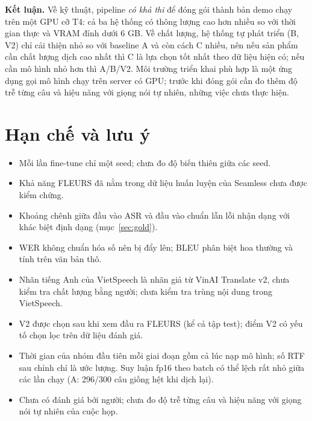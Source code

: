 \documentclass[12pt,a4paper]{article}
\begin{document}
\textbf{Kết luận.} Về kỹ thuật, pipeline \emph{có khả thi} để đóng gói thành bản demo chạy trên một GPU cỡ T4: cả ba hệ thống có thông lượng cao hơn nhiều so với thời gian thực và VRAM đỉnh dưới 6 GB. Về chất lượng, hệ thống tự phát triển (B, V2) chỉ cải thiện nhỏ so với baseline A và còn cách C nhiều, nên nếu sản phẩm cần chất lượng dịch cao nhất thì C là lựa chọn tốt nhất theo dữ liệu hiện có; nếu cần mô hình nhỏ hơn thì A/B/V2. Môi trường triển khai phù hợp là một ứng dụng gọi mô hình chạy trên server có GPU; trước khi đóng gói cần đo thêm độ trễ từng câu và hiệu năng với giọng nói tự nhiên, những việc chưa thực hiện.

\section{Hạn chế và lưu ý}\label{sec:limit}
\begin{itemize}[nosep]
\item Mỗi lần fine-tune chỉ một seed; chưa đo độ biến thiên giữa các seed.
\item Khả năng FLEURS đã nằm trong dữ liệu huấn luyện của Seamless chưa được kiểm chứng.
\item Khoảng chênh giữa đầu vào ASR và đầu vào chuẩn lẫn lỗi nhận dạng với khác biệt định dạng (mục~\ref{sec:gold}).
\item WER không chuẩn hóa số nên bị đẩy lên; BLEU phân biệt hoa thường và tính trên văn bản thô.
\item Nhãn tiếng Anh của VietSpeech là nhãn giả từ VinAI Translate v2, chưa kiểm tra chất lượng bằng người; chưa kiểm tra trùng nội dung trong VietSpeech.
\item V2 được chọn sau khi xem đầu ra FLEURS (kể cả tập test); điểm V2 có yếu tố chọn lọc trên dữ liệu đánh giá.
\item Thời gian của nhóm đầu tiên mỗi giai đoạn gồm cả lúc nạp mô hình; số RTF sau chỉnh chỉ là ước lượng. Suy luận fp16 theo batch có thể lệch rất nhỏ giữa các lần chạy (A: 296/300 câu giống hệt khi dịch lại).
\item Chưa có đánh giá bởi người; chưa đo độ trễ từng câu và hiệu năng với giọng nói tự nhiên của cuộc họp.
\end{itemize}

\appendix
\end{document}
